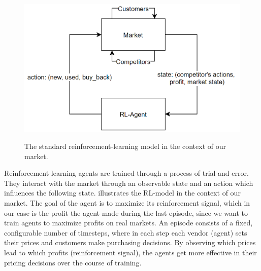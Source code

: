 \begin{figure}
	\centering
	\includegraphics[height = 7 cm]{images/RL-Overview.png}\\[1 ex]
	\caption{The standard reinforcement-learning model in the context of our market.}\label{fig:IntroRLDiagram}
\end{figure}

Reinforcement-learning agents are trained through a process of trial-and-error. They interact with the market through an observable state and an action which influences the following state.  illustrates the RL-model in the context of our market. The goal of the agent is to maximize its reinforcement signal, which in our case is the profit the agent made during the last episode, since we want to train agents to maximize profits on real markets. An episode consists of a fixed, configurable number of timesteps, where in each step each vendor (agent) sets their prices and customers make purchasing decisions. By observing which prices lead to which profits (reinforcement signal), the agents get more effective in their pricing decisions over the course of training.